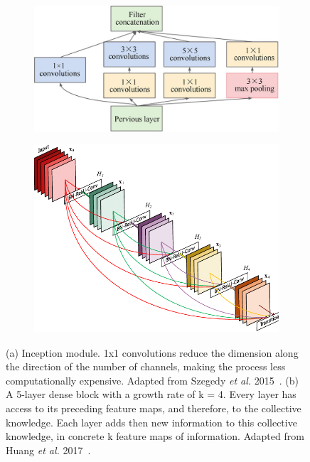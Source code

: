 \begin{figure}[h]
     \centering
     \begin{subfigure}[b]{0.45\textwidth}
         \centering
         \includegraphics[width=\textwidth]{images/approaches/deep_learning/inception_mod.png}
         \caption{}
         \label{fig:inception}
     \end{subfigure}
     \hfill
     \begin{subfigure}[b]{0.45\textwidth}
         \centering
         \includegraphics[width=\textwidth]{images/approaches/deep_learning/dense_block.png}
         \caption{}
         \label{fig:dense-block}
     \end{subfigure}
        \caption{(a) Inception module. 1x1 convolutions reduce the dimension along the direction of the number of channels, making the process less computationally expensive.
        Adapted from Szegedy \textit{et al.} 2015~\cite{szegedy2015going}.
        (b) A 5-layer dense block with a growth rate of k = 4.
        Every layer has access to its preceding feature maps, and therefore, to the collective knowledge.
        Each layer adds then new information to this collective knowledge, in concrete k feature maps of information.
        Adapted from Huang \textit{et al.} 2017~\cite{huang2017densely}.}
        \label{fig:inception-dense}
\end{figure}


